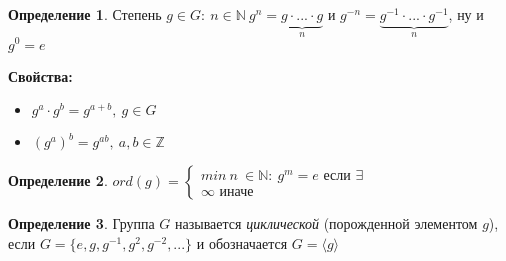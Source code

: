 \documentclass[a4paper, 12pt]{article}
\theoremstyle{definition}
\newtheorem*{definition}{Определение}
\begin{document}
    \begin{definition}
        Степень $g \in G:\ n \in \mathbb{N}\ g^n = \underbrace{g\cdot...\cdot g}_{n}$ и $g^{-n} = \underbrace{g^{-1}\cdot...\cdot g^{-1}}_{n}$, ну и $g^0 = e$ 
    \end{definition}

    \textbf{Свойства:}
    \begin{itemize}
        \item $g^a\cdot g^b = g^{a + b},\ g \in G$
        \item $(g^a)^b = g^{ab},\ a,b \in \mathbb{Z} $
    \end{itemize}
     
    \begin{definition}
        $ord(g) = \begin{cases}
            min\ n \ \in \mathbb{N}:\ g^m = e \text{ если } \exists\\
            \infty \text{ иначе}
        \end{cases}$
    \end{definition}

    \begin{definition}
        Группа $G$ называется \textit{циклической} (порожденной элементом $g$), если $G = \{e, g, g^{-1}, g^2, g^{-2},...\}$ и обозначается $G = \langle g\rangle$ 
    \end{definition}
\end{document}

